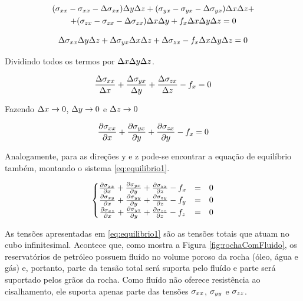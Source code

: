 \begin{multline} \label{eq:equilibrio0}
   (\stxx - \stxx - \Delta \stxx) \Dy\Dz + (\styx - \styx - \Delta \styx)\Dx\Dz  +\\
   + (\stzx - \stzx - \Delta\stzx) \Dx\Dy + f_x\Dx\Dy\Dz = 0
\end{multline}


\begin{equation}
 \Delta \stxx \Dy\Dz + \Delta \styx\Dx\Dz + \Delta\stzx - f_x\Dx\Dy\Dz = 0
\end{equation}

Dividindo todos os termos por $\Dx\Dy\Dz$.


\begin{equation}
\frac{ \Delta \stxx }{ \Dx } + \frac{\Delta \styx}{ \Dy } + \frac{\Delta\stzx}{ \Dz } - f_x = 0
\end{equation}

Fazendo $\Dx \rightarrow 0$, $\Dy \rightarrow 0 $ e $\Dz \rightarrow 0$

\begin{equation}
\dx[\stxx] + \dy[\styx] + \dy[\stzx] - f_x = 0
\end{equation}

Analogamente, para as direções y e z pode-se encontrar a equação de equilíbrio também, montando o sistema \eqref{eq:equilibrio1}.

\begin{equation}
\label{eq:equilibrio1}
\left\{\begin{matrix}
 \dx[\stxx] + \dy[\styx] + \dz[\stzx] - f_x & = & 0\\
 \dx[\stxy] + \dy[\styy] + \dz[\stzy] - f_y & = & 0\\
 \dx[\stxz] + \dy[\styz] + \dz[\stzz] - f_z & = & 0
\end{matrix}\right.
\end{equation}


As tensões apresentadas em \eqref{eq:equilibrio1} são as tensões totais que atuam no cubo infinitesimal. Acontece que, como mostra a Figura \ref{fig:rochaComFluido}, os reservatórios de petróleo possuem fluído no volume poroso da rocha (óleo, água e gás) e, portanto, parte da tensão total será suporta pelo fluído e parte será suportado pelos grãos da rocha. Como fluído não oferece resistência ao cisalhamento, ele suporta apenas parte das tensões $\stxx$, $\styy$ e $\stzz$.

